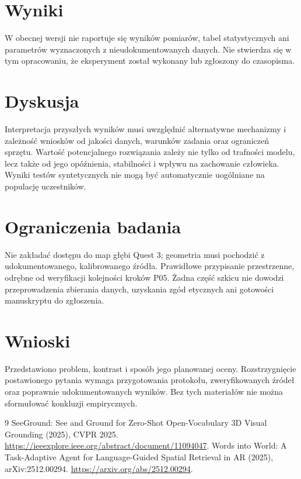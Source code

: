 \documentclass[11pt,a4paper]{article}
\begin{document}
\section{Wyniki}

W obecnej wersji nie raportuje się wyników pomiarów, tabel statystycznych ani parametrów wyznaczonych z nieudokumentowanych danych. Nie stwierdza się w tym opracowaniu, że eksperyment został wykonany lub zgłoszony do czasopisma.

\section{Dyskusja}

Interpretacja przyszłych wyników musi uwzględnić alternatywne mechanizmy i zależność wniosków od jakości danych, warunków zadania oraz ograniczeń sprzętu. Wartość potencjalnego rozwiązania zależy nie tylko od trafności modelu, lecz także od jego opóźnienia, stabilności i wpływu na zachowanie człowieka. Wyniki testów syntetycznych nie mogą być automatycznie uogólniane na populację uczestników.

\section{Ograniczenia badania}

Nie zakładać dostępu do map głębi Quest 3; geometria musi pochodzić z udokumentowanego, kalibrowanego źródła. Prawidłowe przypisanie przestrzenne, odrębne od weryfikacji kolejności kroków P05. Żadna część szkicu nie dowodzi przeprowadzenia zbierania danych, uzyskania zgód etycznych ani gotowości manuskryptu do zgłoszenia.

\section{Wnioski}

Przedstawiono problem, kontrast i sposób jego planowanej oceny. Rozstrzygnięcie postawionego pytania wymaga przygotowania protokołu, zweryfikowanych źródeł oraz poprawnie udokumentowanych wyników. Bez tych materiałów nie można sformułować konkluzji empirycznych.

\begin{thebibliography}{9}
 SeeGround: See and Ground for Zero-Shot Open-Vocabulary 3D Visual Grounding (2025), CVPR 2025. \url{https://ieeexplore.ieee.org/abstract/document/11094047}.
 Words into World: A Task-Adaptive Agent for Language-Guided Spatial Retrieval in AR (2025), arXiv:2512.00294. \url{https://arxiv.org/abs/2512.00294}.
\end{thebibliography}
\end{document}
